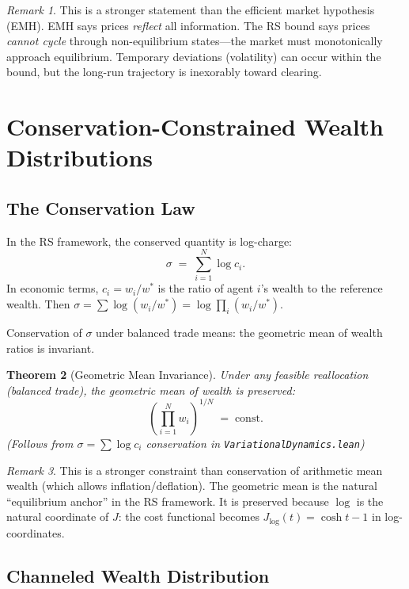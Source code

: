 \documentclass[11pt,a4paper]{article}
\theoremstyle{plain}
\newtheorem{theorem}{Theorem}[section]
\theoremstyle{definition}
\theoremstyle{remark}
\newtheorem{remark}[theorem]{Remark}
\newcommand{\Jcost}{J}
\begin{document}
\begin{remark}
This is a stronger statement than the efficient market hypothesis (EMH).
EMH says prices \emph{reflect} all information.
The RS bound says prices \emph{cannot cycle} through non-equilibrium states---the market must monotonically approach equilibrium.
Temporary deviations (volatility) can occur within the bound, but the long-run trajectory is inexorably toward clearing.
\end{remark}

\section{Conservation-Constrained Wealth Distributions}\label{sec:wealth}

\subsection{The Conservation Law}

In the RS framework, the conserved quantity is log-charge:
\[
\sigma \;=\; \sum_{i=1}^N \log c_i.
\]
In economic terms, $c_i = w_i / w^*$ is the ratio of agent $i$'s wealth to the reference wealth.
Then $\sigma = \sum \log(w_i/w^*) = \log \prod_i (w_i/w^*)$.

Conservation of $\sigma$ under balanced trade means: the geometric mean of wealth ratios is invariant.

\begin{theorem}[Geometric Mean Invariance]\label{thm:geomean}
Under any feasible reallocation (balanced trade), the geometric mean of wealth is preserved:
\[
\left(\prod_{i=1}^N w_i\right)^{1/N} \;=\; \text{const}.
\]
\emph{(Follows from $\sigma = \sum \log c_i$ conservation in \texttt{VariationalDynamics.lean})}
\end{theorem}

\begin{remark}
This is a stronger constraint than conservation of arithmetic mean wealth (which allows inflation/deflation).
The geometric mean is the natural ``equilibrium anchor'' in the RS framework.
It is preserved because $\log$ is the natural coordinate of $\Jcost$: the cost functional becomes $\Jcost_{\log}(t) = \cosh t - 1$ in log-coordinates.
\end{remark}

\subsection{Channeled Wealth Distribution}
\end{document}
